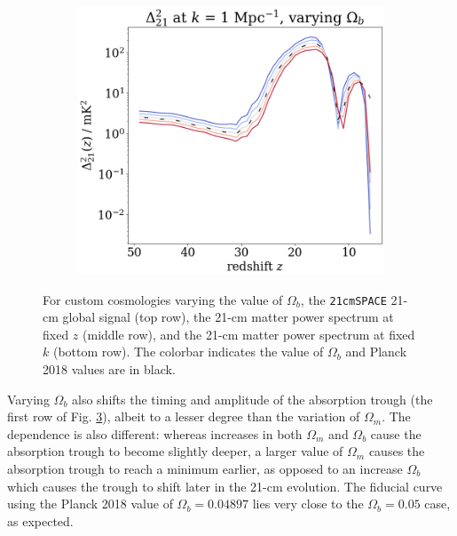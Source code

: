 \documentclass[floats,floatfix,showpacs,amssymb,prd,superscriptaddress,nofootinbib, 11pt]{revtex4-2} %
\newcommand{\code}{\texttt}
\begin{document}
\begin{figure}[H]
\begin{subfigure}[b]{0.45\textwidth}
         \label{fig:power_spectrum_fixed_k_0.1_Ob}
     \end{subfigure}
     \hfill
     \begin{subfigure}[b]{0.45\textwidth}
         \centering
         \includegraphics[width=\textwidth]{images/simulation_results/power_spectrum_fixed_k_1_Ob.png}
         \label{fig:power_spectrum_fixed_k_1_Ob}
     \end{subfigure}
        \caption{For custom cosmologies varying the value of $\Omega_b$, the \code{21cmSPACE} 21-cm global signal (top row), the 21-cm matter power spectrum at fixed $z$ (middle row), and the 21-cm matter power spectrum at fixed $k$ (bottom row). The colorbar indicates the value of $\Omega_b$ and Planck 2018 values are in black.}
        \label{fig:simulation_results_Ob}
\end{figure}

Varying $\Omega_b$ also shifts the timing and amplitude of the absorption trough (the first row of Fig. \ref{fig:simulation_results_Ob}), albeit to a lesser degree than the variation of $\Omega_m$. The dependence is also different: whereas increases in both $\Omega_m$ and $\Omega_b$ cause the absorption trough to become slightly deeper, a larger value of $\Omega_m$ causes the absorption trough to reach a minimum earlier, as opposed to an increase $\Omega_b$ which causes the trough to shift later in the 21-cm evolution. The fiducial curve using the  Planck 2018 value of $\Omega_b = 0.04897$ lies very close to the $\Omega_b = 0.05$ case, as expected.
\end{document}
